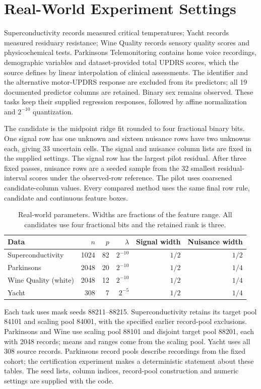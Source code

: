 \section{Real-World Experiment Settings}\label{app:public-energy-v84}
Superconductivity records measured critical temperatures; Yacht records measured residuary resistance; Wine Quality records sensory quality scores and physicochemical tests. Parkinsons Telemonitoring contains home voice recordings, demographic variables and dataset-provided total UPDRS scores, which the source defines by linear interpolation of clinical assessments. The identifier and the alternative motor-UPDRS response are excluded from its predictors; all 19 documented predictor columns are retained. Binary sex remains observed. These tasks keep their supplied regression responses, followed by affine normalization and $2^{-10}$ quantization.

The candidate is the midpoint ridge fit rounded to four fractional binary bits. One signal row has one unknown and sixteen nuisance rows have two unknowns each, giving 33 uncertain cells. The signal and nuisance column lists are fixed in the supplied settings. The signal row has the largest pilot residual. After three fixed passes, nuisance rows are a seeded sample from the 32 smallest residual-interval scores under the observed-row reference. The pilot uses coarsened candidate-column values. Every compared method uses the same final row rule, candidate and continuous feature boxes.

\begin{table}[t]\centering\small
\caption{Real-world parameters. Widths are fractions of the feature range. All candidates use four fractional bits and the retained rank is three.}
\begin{tabular}{lrrrrr}\toprule
Data & $n$ & $p$ & $\lambda$ & Signal width & Nuisance width\\\midrule
Superconductivity&1024&82&$2^{-10}$&$1/2$&$1/2$\\
Parkinsons&2048&20&$2^{-10}$&$1/2$&$1/4$\\
Wine Quality (white)&2048&12&$2^{-10}$&$1/2$&$1/4$\\
Yacht&308&7&$2^{-5}$&$1/2$&$1/4$\\\bottomrule
\end{tabular}\end{table}

Each task uses mask seeds 88211--88215. Superconductivity retains its target pool 84101 and scaling pool 84001, with the specified earlier record-pool exclusions. Parkinsons and Wine use scaling pool 88101 and disjoint target pool 88201, each with 2048 records; means and ranges come from the scaling pool. Yacht uses all 308 source records. Parkinsons record pools describe recordings from the fixed cohort; the certification experiment makes a deterministic statement about these tables. The seed lists, column indices, record-pool construction and numeric settings are supplied with the code.

